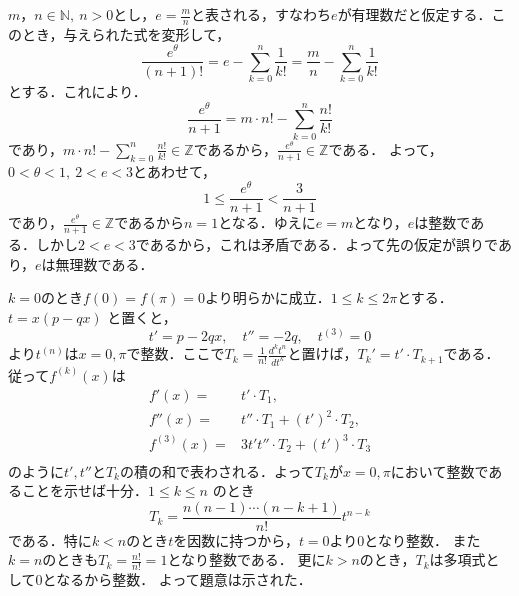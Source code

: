 \begin{tproof}
    $m，n \in \mathbb{N},~n >0$とし，$e=\frac{m}{n}$と表される，すなわち$e$が有理数だと仮定する．このとき，与えられた式を変形して，
    \[
        \frac{e^\theta}{(n+1)!} = e-\sum_{k=0}^{n} \frac{1}{k!} =\frac{m}{n}-\sum_{k=0}^{n} \frac{1}{k!}
    \]
    とする．これにより．
    \[
        \frac{e^{\theta}}{n+1} = m \cdot n! - \sum_{k=0}^{n} \frac{n!}{k!}
    \]
    であり，$m \cdot n! - \sum_{k=0}^{n} \frac{n!}{k!} \in \mathbb{Z}$であるから，$\frac{e^{\theta}}{n+1} \in \mathbb{Z}$である．
    よって，$0< \theta <1,~2<e<3$とあわせて，
    \[
        1 \le \frac{e^{\theta}}{n+1} < \frac{3}{n+1}
    \]
    であり，$\frac{e^{\theta}}{n+1} \in \mathbb{Z}$であるから$n=1$となる．ゆえに$e=m$となり，$e$は整数である．しかし$2<e<3$であるから，これは矛盾である．よって先の仮定が誤りであり，$e$は無理数である．
\end{tproof}



\begin{tproof}
    $k = 0$のとき$f(0) = f(\pi) = 0$より明らかに成立．$1 \leq k \leq 2\pi$とする．
    $t = x(p - qx)$ と置くと，
    \[
        t' = p - 2qx, \quad t'' = -2q, \quad t^{(3)} = 0
    \]
    より$t^{(n)}$は$x=0,\pi$で整数．ここで$T_k = \frac{1}{n!}\frac{d^kt^n}{dt^k}$と置けば，$T_k' = t' \cdot T_{k+1}$である．従って$f^{(k)}(x)$は
    \begin{align*}
        f'(x) ={}      & t' \cdot T_1,                       \\
        f''(x) ={}     & t'' \cdot T_1 + (t')^2 \cdot T_2,   \\
        f^{(3)}(x) ={} & 3t't'' \cdot T_2 + (t')^3 \cdot T_3 \\
    \end{align*}
    のように$t', t''$と$T_k$の積の和で表わされる．よって$T_k$が$x = 0, \pi$において整数であることを示せば十分．$1 \leq k \leq n$ のとき
    \[
        T_k = \frac{n(n-1)\dotsm(n-k+1)}{n!}t^{n-k}
    \]
    である．特に$k < n$のとき$t$を因数に持つから，$t = 0$より$0$となり整数．
    また$k = n$のときも$T_k = \frac{n!}{n!} = 1$となり整数である．
    更に$k > n$のとき，$T_k$は多項式として$0$となるから整数．
    よって題意は示された．
\end{tproof}

